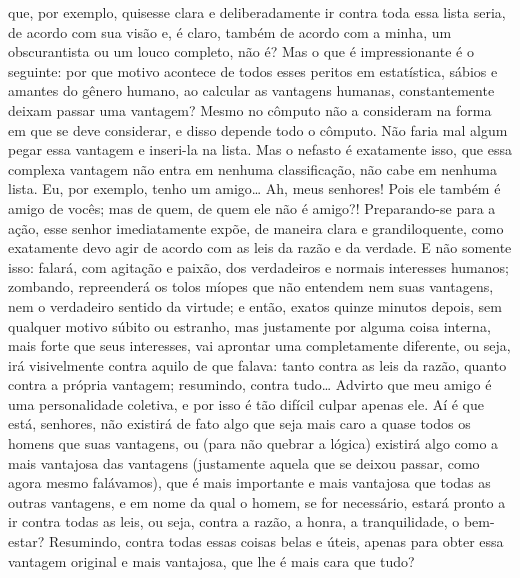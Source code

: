 que, por exemplo, quisesse clara e deliberadamente ir contra toda essa
lista seria, de acordo com sua visão e, é claro, também de acordo com a
minha, um obscurantista ou um louco completo, não é? Mas o que é
impressionante é o seguinte: por que motivo acontece de todos esses
peritos em estatística, sábios e amantes do gênero humano, ao calcular
as vantagens humanas, constantemente deixam passar uma vantagem? Mesmo
no cômputo não a consideram na forma em que se deve considerar, e disso
depende todo o cômputo. Não faria mal algum pegar essa vantagem e
inseri-la na lista. Mas o nefasto é exatamente isso, que essa complexa
vantagem não entra em nenhuma classificação, não cabe em nenhuma lista.
Eu, por exemplo, tenho um amigo\ldots{} Ah, meus senhores! Pois ele também é
amigo de vocês; mas de quem, de quem ele não é amigo?! Preparando-se
para a ação, esse senhor imediatamente expõe, de maneira clara e
grandiloquente, como exatamente devo agir de acordo com as leis da
razão e da verdade. E não somente isso: falará, com agitação e paixão,
dos verdadeiros e normais interesses humanos; zombando, repreenderá os
tolos míopes que não entendem nem suas vantagens, nem o verdadeiro
sentido da virtude; e então, exatos quinze minutos depois, sem qualquer
motivo súbito ou estranho, mas justamente por alguma coisa interna,
mais forte que seus interesses, vai aprontar uma completamente
diferente, ou seja, irá visivelmente contra aquilo de que falava: tanto
contra as leis da razão, quanto contra a própria vantagem; resumindo,
contra tudo\ldots{} Advirto que meu amigo é uma personalidade coletiva, e
por isso é tão difícil culpar apenas ele. Aí é que está, senhores, não
existirá de fato algo que seja mais caro a quase todos os homens que
suas vantagens, ou (para não quebrar a lógica) existirá algo como a
mais vantajosa das vantagens (justamente aquela que se deixou passar,
como agora mesmo falávamos), que é mais importante e mais vantajosa que
todas as outras vantagens, e em nome da qual o homem, se for
necessário, estará pronto a ir contra todas as leis, ou seja, contra a
razão, a honra, a tranquilidade, o bem-estar? Resumindo, contra todas
essas coisas belas e úteis, apenas para obter essa vantagem original e
mais vantajosa, que lhe é mais cara que tudo?


